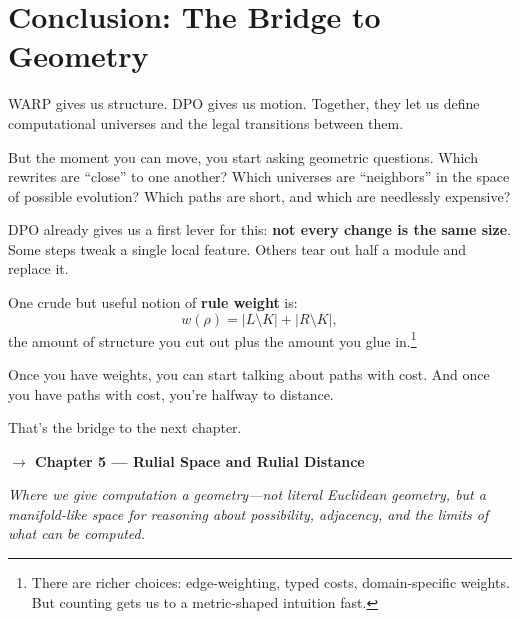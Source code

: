 \section{Conclusion: The Bridge to Geometry}
\label{sec:bridge-geometry}

WARP gives us structure. DPO gives us motion.
Together, they let us define computational universes and the legal transitions between them.

But the moment you can move, you start asking geometric questions.
Which rewrites are ``close'' to one another?
Which universes are ``neighbors'' in the space of possible evolution?
Which paths are short, and which are needlessly expensive?

DPO already gives us a first lever for this: \textbf{not every change is the same size}.
Some steps tweak a single local feature. Others tear out half a module and replace it.

One crude but useful notion of \textbf{rule weight} is:
\[
w(\rho) = |L \setminus K| + |R \setminus K| ,
\]
the amount of structure you cut out plus the amount you glue in.\footnote{There are richer choices: edge-weighting, typed costs, domain-specific weights. But counting gets us to a metric-shaped intuition fast.}

Once you have weights, you can start talking about paths with cost.
And once you have paths with cost, you're halfway to distance.

That's the bridge to the next chapter.

\textbf{$\rightarrow$ Chapter 5 --- Rulial Space and Rulial Distance}

\textit{Where we give computation a geometry---not literal Euclidean geometry, but a manifold-like space for reasoning about possibility, adjacency, and the limits of what can be computed.}
